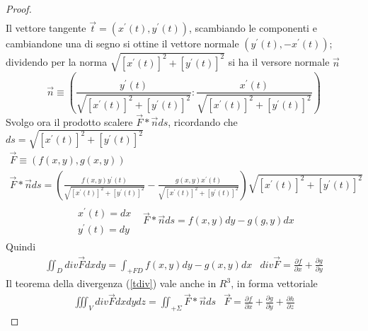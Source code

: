 \begin{proof}
\begin{equation*}
\begin{matrix}
		\end{matrix}
	\end{equation*}
	Il vettore tangente $\vec{t}=(x^\prime(t),y^\prime(t))$, scambiando le
	componenti e cambiandone una di segno si ottine il vettore normale
	$(y^\prime(t),-x^\prime (t))$; dividendo per la norma
	$\sqrt{[x^\prime(t)]^2+[y^\prime(t)]^2}$ si ha il versore normale $\vec{n}$
	\begin{equation*}
		\vec{n}\equiv
		\left(\frac{y^\prime(t)}{\sqrt{[x^\prime(t)]^2+[y^\prime(t)]^2}}:
		\frac{x^\prime (t)}{\sqrt{[x^\prime(t)]^2+[y^\prime(t)]^2}}\right)
	\end{equation*}
	Svolgo ora il prodotto scalere $\vec{F}*\vec{n}ds$, ricordando che
	$ds=\sqrt{[x^\prime(t)]^2+[y^\prime(t)]^2}$ 
	\begin{align*}
		\vec{F}\equiv (f(x,y), g(x,y))\\
		\vec{F}*\vec{n}ds=\left(\frac{f(x,y)y^\prime(t)}{\sqrt{[x^\prime(t)]^2+[y^\prime(t)]^2}}-\frac{g(x,y)x^\prime(t)}{\sqrt{[x^\prime(t)]^2+[y^\prime(t)]^2}}\right)\sqrt{[x^\prime(t)]^2+[y^\prime(t)]^2}
	\end{align*}
	\begin{equation*}
		\begin{matrix}
			\begin{matrix}
				x^\prime(t)=dx\\
				y^\prime(t)=dy
			\end{matrix}&\vec{F}*\vec{n}ds=f(x,y)dy-g(g,y)dx
		\end{matrix}
	\end{equation*}
	Quindi 
	\begin{eqnarray*}
		\iint_D div \vec{F}dxdy=\int_{+FD}f(x,y)dy-g(x,y)dx & div
		\vec{F}=\frac{\partial f}{\partial x}+ \frac{\partial g}{\partial y}
	\end{eqnarray*}
	Il teorema della divergenza (\ref{tdiv}) vale anche in $R^3$, in forma
	vettoriale
	\begin{eqnarray*}
		\iiint_{V}div \vec{F} dxdydz = \iint_{+\Sigma}\vec{F}*\vec{n}ds &\vec{F}
		=\frac{\partial f}{\partial x}+ \frac{\partial g}{\partial y} + 
		\frac{\partial h}{\partial z}
	\end{eqnarray*}
\end{proof}

